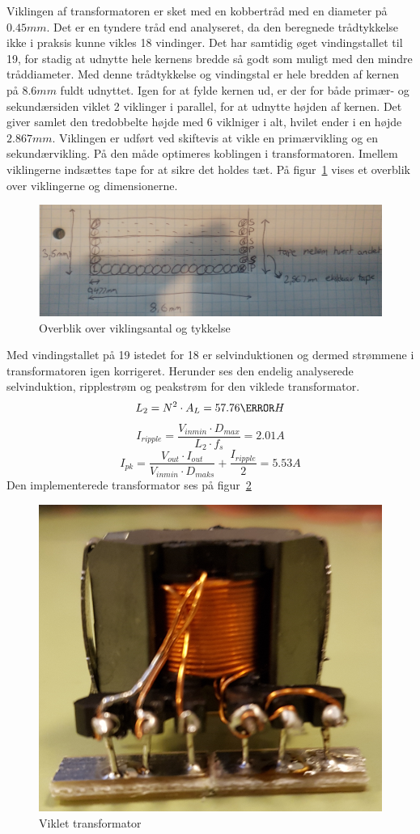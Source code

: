 Viklingen af transformatoren er sket med en kobbertråd med en diameter på $0.45mm$. Det er en tyndere tråd end analyseret, da den beregnede trådtykkelse ikke i praksis kunne vikles 18 vindinger. Det har samtidig øget vindingstallet til 19, for stadig at udnytte hele kernens bredde så godt som muligt med den mindre tråddiameter. Med denne trådtykkelse og vindingstal er hele bredden af kernen på $8.6mm$ fuldt udnyttet. Igen for at fylde kernen ud, er der for både primær- og sekundærsiden viklet 2 viklinger i parallel, for at udnytte højden af kernen. Det giver samlet den tredobbelte højde med 6 viklniger i alt, hvilet ender i en højde $2.867mm$. Viklingen er udført ved skiftevis at vikle en primærvikling og en sekundærvikling. På den måde optimeres koblingen i transformatoren. Imellem viklingerne indsættes tape for at sikre det holdes tæt. På figur~\ref{fig: viklingsoverblik} vises et overblik over viklingerne og dimensionerne. 
\begin{figure}[H]
	\center
	\includegraphics[max width=0.7\linewidth]{../dokumentation/tex/2iteration/billeder/viklingsoverblik.png}
	\caption{Overblik over viklingsantal og tykkelse}
	\label{fig: viklingsoverblik}
\end{figure}
Med vindingstallet på 19 istedet for 18 er selvinduktionen og dermed strømmene i transformatoren igen korrigeret. Herunder ses den endelig analyserede selvinduktion, ripplestrøm og peakstrøm for den viklede transformator.
\begin{equation} \label{L_2}
L_2 = N^2 \cdot A_L = 57.76\micro H
\end{equation}
\begin{equation} \label{I_ripple_final}
I_{ripple} = \frac{V_{inmin} \cdot D_{max}}{L_2 \cdot f_s} = 2.01A
\end{equation}
\begin{equation} \label{I_pk_final}
I_{pk} = \frac{V_{out} \cdot I_{out}}{V_{inmin} \cdot D_{maks}} + \frac{I_{ripple}}{2} = 5.53A
\end{equation}
Den implementerede transformator ses på figur~\ref{fig: Viklettrans}
\begin{figure}[H]
	\center
	\includegraphics[max width=0.5\linewidth]{../dokumentation/tex/2iteration/billeder/Viklet_transformator.PNG}
	\caption{Viklet transformator}
	\label{fig: Viklettrans}
\end{figure}
